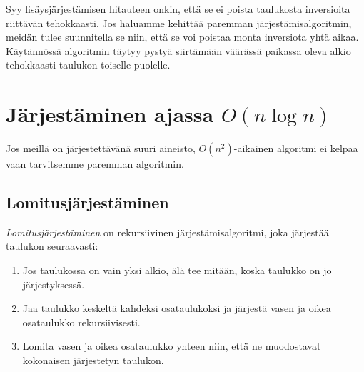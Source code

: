 Syy lisäysjärjestämisen hitauteen onkin,
että se ei poista taulukosta inversioita riittävän tehokkaasti.
Jos haluamme kehittää paremman järjestämis\-algoritmin,
meidän tulee suunnitella se niin, että se voi poistaa
monta inversiota yhtä aikaa.
Käytännössä algoritmin täytyy pystyä siirtämään
väärässä paikassa oleva alkio tehokkaasti taulukon
toiselle puolelle.

\section{Järjestäminen ajassa $O(n \log n)$}

Jos meillä on järjestettävänä suuri aineisto,
$O(n^2)$-aikainen algoritmi ei kelpaa vaan tarvitsemme
paremman algoritmin.

\subsection{Lomitusjärjestäminen}

\emph{Lomitusjärjestäminen} on rekursiivinen järjestämisalgoritmi,
joka järjestää taulukon seuraavasti:

\begin{enumerate}
\item Jos taulukossa on vain yksi alkio,
älä tee mitään, koska taulukko on jo järjestyksessä.
\item Jaa taulukko keskeltä kahdeksi osataulukoksi ja järjestä
vasen ja oikea osataulukko rekursiivisesti.
\item Lomita vasen ja oikea osataulukko yhteen niin, että ne muodostavat
kokonaisen järjestetyn taulukon.
\end{enumerate}

